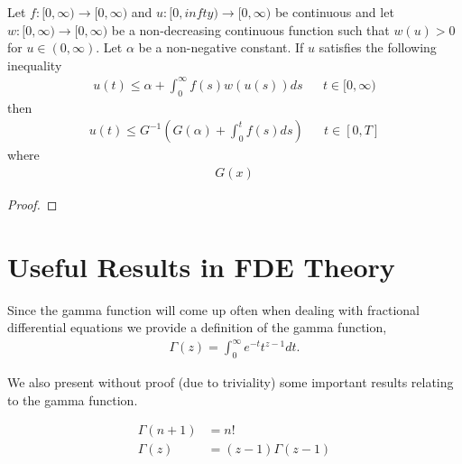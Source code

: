 \documentclass{unswmaths}
\begin{document}
\begin{unswlem}
    Let $ f : [0, \infty) \longrightarrow [0, \infty) $ and $ u : [0, infty) \longrightarrow [0,\infty) $ 
    be continuous and let $ w : [0, \infty) \longrightarrow [0, \infty) $ be a non-decreasing continuous function
    such that $ w(u) > 0 $ for $ u \in (0, \infty) $.
    Let $ \alpha $ be a non-negative constant.
    If $ u $ satisfies the following inequality
    \begin{align*}
        u(t) \leq \alpha + \int_0^\infty f(s)w(u(s))ds  && t \in [0, \infty)
    \end{align*}
    then
    \begin{align*}
        u(t) \leq G^{-1}\left( G(\alpha) + \int^t_0 f(s)ds \right) && t \in [0, T]
    \end{align*}
    where
    \begin{align*}
        G(x)
    \end{align*}
\end{unswlem}
\begin{proof}
\end{proof}

\section*{Useful Results in FDE Theory}
Since the gamma function will come up often when dealing with fractional differential equations we
provide a definition of the gamma function, 
\begin{align*}
	\Gamma(z) = \int_0^\infty e^{-t}t^{z-1} dt.
\end{align*}

We also present without proof (due to triviality) some important results relating to the gamma function.

\begin{align*}
	\Gamma(n+1) 	&= n! \\
	\Gamma(z)	&= (z-1)\Gamma(z-1)
\end{align*}
\end{document}
